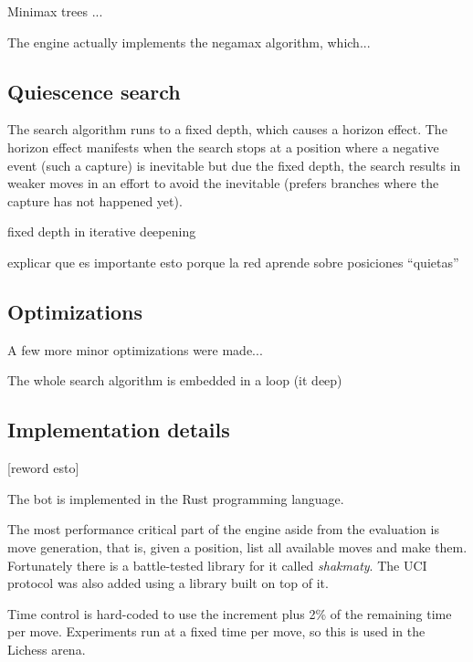 Minimax trees \cite{minimax-survey:1995} ...


The engine actually implements the negamax algorithm, which...

\subsection{Quiescence search}

The search algorithm runs to a fixed depth, which causes a horizon effect. The horizon effect manifests when the search stops at a position where a negative event (such a capture) is inevitable but due the fixed depth, the search results in weaker moves in an effort to avoid the inevitable (prefers branches where the capture has not happened yet).



fixed depth in iterative deepening

explicar que es importante esto porque la red aprende sobre posiciones \enquote{quietas}

\subsection{Optimizations}

A few more minor optimizations were made...

The whole search algorithm is embedded in a loop (it deep)




\subsection{Implementation details}

[reword esto]

The bot is implemented in the Rust programming language.

The most performance critical part of the engine aside from the evaluation is move generation, that is, given a position, list all available moves and make them.
Fortunately there is a battle-tested library for it called \textit{shakmaty}. The UCI protocol was also added using a library built on top of it.

Time control is hard-coded to use the increment plus 2\% of the remaining time per move. Experiments run at a fixed time per move, so this is used in the Lichess arena.


